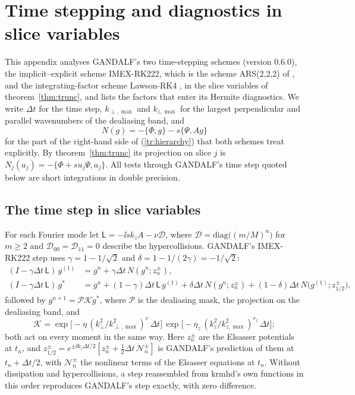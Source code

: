 \section{Time stepping and diagnostics in slice variables}\label{app:timestepping}

This appendix analyses GANDALF's two time-stepping schemes (version 0.6.0), the implicit--explicit scheme IMEX-RK222, which is the scheme ARS(2,2,2) of \citet{AscherRuuthSpiteri1997}, and the integrating-factor scheme Lawson-RK4 \citep{Lawson1967}, in the slice variables of theorem~\ref{thm:trunc}, and lists the factors that enter its Hermite diagnostics. We write $\Delta t$ for the time step, $k_{\perp,\max}$ and $k_{z,\max}$ for the largest perpendicular and parallel wavenumbers of the dealiasing band, and
\begin{equation*}
  N(g)=-\{\Phi,g\}-s\{\Psi,Ag\}
\end{equation*}
for the part of the right-hand side of (\ref{tr:hierarchy}) that both schemes treat explicitly. By theorem~\ref{thm:trunc} its projection on slice $j$ is $N_j(a_j)=-\{\Phi+su_j\Psi,a_j\}$. All tests through GANDALF's time step quoted below are short integrations in double precision.

\subsection{The time step in slice variables}\label{appD:step}

For each Fourier mode let $\mathsf L=-\ii sk_zA-\nu\mathcal D$, where $\mathcal D=\mathrm{diag}\big((m/M)^n\big)$ for $m\ge2$ and $\mathcal D_{00}=\mathcal D_{11}=0$ describe the hypercollisions. GANDALF's IMEX-RK222 step uses $\gamma=1-1/\sqrt2$ and $\delta=1-1/(2\gamma)=-1/\sqrt2$:
\begin{align*}
  (I-\gamma\Delta t\,\mathsf L)\,g^{(1)}&=g^n+\gamma\Delta t\,N(g^n;z^\pm_n),\\
  (I-\gamma\Delta t\,\mathsf L)\,g^{*}&=g^n+(1-\gamma)\Delta t\,\mathsf L\,g^{(1)}+\delta\Delta t\,N(g^n;z^\pm_n)+(1-\delta)\Delta t\,N\big(g^{(1)};z^\pm_{1/2}\big),
\end{align*}
followed by $g^{n+1}=\mathcal P\mathcal K g^*$, where $\mathcal P$ is the dealiasing mask, the projection on the dealiasing band, and
\begin{equation*}
  \mathcal K=\exp\big[-\eta\,(k_\perp^2/k_{\perp,\max}^2)^r\,\Delta t\big]\,\exp\big[-\eta_z\,(k_z^2/k_{z,\max}^2)^{r_z}\,\Delta t\big];
\end{equation*}
both act on every moment in the same way. Here $z^\pm_n$ are the Elsasser potentials at $t_n$, and $z^\pm_{1/2}=e^{\pm\ii k_z\Delta t/2}[z^\pm_n+\frac12\Delta t\,\mathcal N^\pm_n]$ is GANDALF's prediction of them at $t_n+\Delta t/2$, with $\mathcal N^\pm_n$ the nonlinear terms of the Elsasser equations at $t_n$. Without dissipation and hypercollisions, a step reassembled from krmhd's own functions in this order reproduces GANDALF's step exactly, with zero difference.


